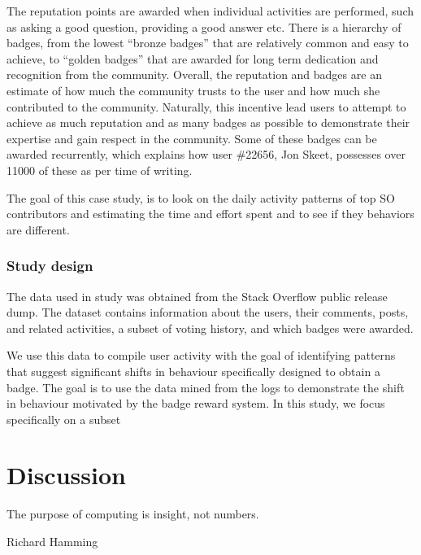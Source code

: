 The reputation points are awarded when individual activities are performed, such as asking a good question, providing a good answer etc. There is a hierarchy of badges, from the lowest ``bronze badges'' that are relatively common and easy to achieve, to ``golden badges'' that are awarded for long term dedication and recognition from the community. Overall, the reputation and badges are an estimate of how much the community trusts to the user and how much she contributed to the community. Naturally, this incentive lead users to attempt to achieve as much reputation and as many badges as possible to demonstrate their expertise and gain respect in the community. Some of these badges can
be awarded recurrently, which explains how user \#22656, Jon Skeet, possesses over 11000 of these as per time of writing.

The goal of this case study, is to look on the daily activity patterns of top SO contributors and estimating the time and effort spent and to see if they behaviors are different.

\subsubsection{Study design}
The data used in study was obtained from the Stack Overflow public release dump. The dataset contains information about the users, their comments, posts, and related activities, a subset of voting history, and which badges were awarded. 


We use this data to compile
user activity with the goal of identifying patterns that suggest
significant shifts in behaviour specifically designed to obtain
a badge. The goal is to use the data mined from the logs
to demonstrate the shift in behaviour motivated by the badge
reward system. In this study, we focus specifically on a subset



\section{Discussion}

\epigraph{The purpose of computing is insight, not numbers.}{Richard Hamming}
